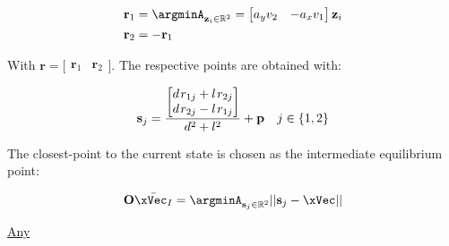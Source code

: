 \begin{subequations}
    \begin{align}
        &\mathbf{r}_1 = \argminA_{\mathbf{z}_i \in \mathbb{R}^2} = \begin{bmatrix} a_yv_2 & - a_xv_1 \end{bmatrix} \mathbf{z}_{i} \label{eq:Constraint_Tangent_Point_bc_per} \\
        &\mathbf{r}_2 = -\mathbf{r}_1 \label{eq:Constraint_Tangent_Point_bc_perp_inverse}
    \end{align}
    \label{eq:Constraint_Tangent_Point_bc}
\end{subequations}   

    

With \(\mathbf{r} = \bigl[\begin{smallmatrix} \mathbf{r}_1&\mathbf{r}_2\end{smallmatrix} \bigr]\). The respective points are obtained with:

\begin{equation}
    \mathbf{s}_j = \frac{\begin{bmatrix} d \hspace{0.1em}r_{1j} + l \hspace{0.1em}r_{2j} \\ d \hspace{0.1em} r_{2j} - l \hspace{0.1em} r_{1j}\end{bmatrix}}{d^2 + l^2} + \mathbf{p} \quad j\in \{1,2\}
    \label{eq:Constraint_Tangent_Points}
\end{equation}

The closest-point to the current state is chosen as the intermediate equilibrium point:

\begin{equation}
    \mathbf{O}\bar{\xVec_I} = \argminA_{\mathbf{s}_j \in \mathbb{R}^2} ||\mathbf{s}_j - \xVec|| 
    \label{eq:Intermediate_Equilibrium_Point}
\end{equation}


\underline{Any}
\label{sssec:Constraint_Tangent_Point_Any} \\


